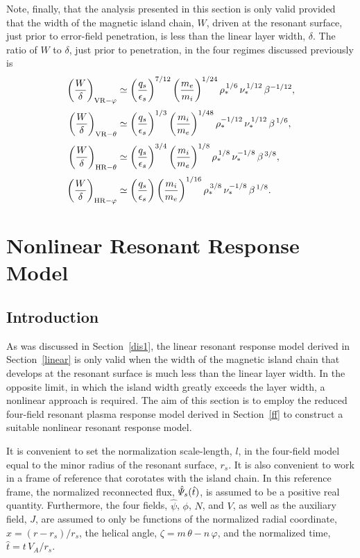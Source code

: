 \documentclass[notitlepage,12pt]{article}
\begin{document}
Note, finally, that the analysis presented in this section is only valid provided that the width of the  magnetic
island chain, $W$,  driven at the resonant surface, just prior to error-field penetration, is less than the linear layer width, $\delta$. 
The ratio of $W$ to $\delta$, just prior to penetration, in the four regimes discussed previously is
\begin{align}
\left(\frac{W}{\delta}\right)_{{\rm VR}-\varphi} &\simeq \left(\frac{q_s}{\epsilon_s}\right)^{7/12}\left(\frac{m_e}{m_i}\right)^{1/24}\rho_\ast^{\,1/6}\,\nu_\ast^{\,1/12}\,\beta^{-1/12},\\[0.5ex]
\left(\frac{W}{\delta}\right)_{{\rm VR}-\theta} &\simeq \left(\frac{q_s}{\epsilon_s}\right)^{1/3}\left(\frac{m_i}{m_e}\right)^{1/48}\rho_\ast^{-1/12}\,\nu_\ast^{\,1/12}\,\beta^{\,1/6},\\[0.5ex]
\left(\frac{W}{\delta}\right)_{{\rm HR}-\theta} &\simeq \left(\frac{q_s}{\epsilon_s}\right)^{3/4}\left(\frac{m_i}{m_e}\right)^{1/8}\rho_\ast^{\,1/8}\,\nu_\ast^{-1/8}\,\beta^{\,3/8},\\[0.5ex]
\left(\frac{W}{\delta}\right)_{{\rm HR}-\varphi} &\simeq \left(\frac{q_s}{\epsilon_s}\right)\left(\frac{m_i}{m_e}\right)^{1/16}\rho_\ast^{\,3/8}\,\nu_\ast^{-1/8}\,\beta^{\,1/8}.
\end{align}

\section{Nonlinear Resonant Response Model}
\subsection{Introduction}
As was discussed in Section~\ref{dis1}, the linear resonant response model derived in Section~\ref{linear} is only
valid when the width of the magnetic island chain that develops at the resonant surface is much less than the linear layer width. 
In the opposite limit, in which the island width greatly exceeds the layer width, a nonlinear approach is required. 
The aim of this section  is to employ the reduced four-field resonant plasma response model derived in Section~\ref{ff} to 
construct a suitable nonlinear resonant response model. 

It is convenient to set the normalization scale-length, $l$, in the four-field  model equal to the minor radius of the resonant surface, $r_s$. It is also convenient to work in a frame of reference that corotates with the island chain. In this reference frame, the
normalized reconnected flux, $\hat{\mit\Psi}_s(\hat{t})$, is assumed to be a positive real quantity. 
Furthermore, the four fields,
$\hat{\psi}$, $\phi$, $N$, and $V$, as well as the auxiliary field, $J$, are assumed to only be functions of  the normalized radial coordinate, $\hat{x} = (r-r_s)/r_s$, the
helical angle, $\zeta= m\,\theta-n\,\varphi$, and the
normalized time, $\hat{t}= t\,V_A/r_s$. 
\end{document}
